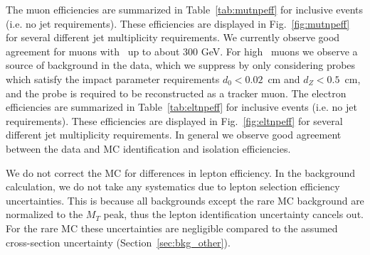 The muon efficiencies are summarized in Table~\ref{tab:mutnpeff} for inclusive events (i.e. no jet requirements). These efficiencies are displayed in Fig.~\ref{fig:mutnpeff} for
several different jet multiplicity requirements. 
We currently observe good agreement for muons with \pt\ up to about 300 GeV. 
For high \pt\ muons we observe a source of background in the data, which we suppress by only considering probes which satisfy the impact parameter requirements $d_0<0.02$~cm and $d_Z<0.5$~cm, and the probe is required to be reconstructed as a tracker muon.
The electron efficiencies are summarized in Table~\ref{tab:eltnpeff} for inclusive events (i.e. no jet requirements). These efficiencies are displayed in Fig.~\ref{fig:eltnpeff} 
for several different jet multiplicity requirements. In general we observe good agreement between the data and MC identification and isolation efficiencies.

We
do not correct the MC for differences in lepton efficiency.  In the
background calculation, we do not take any systematics due to lepton
selection
efficiency uncertainties.  This is because all backgrounds except the 
rare MC background are normalized to the $M_T$ peak, thus the lepton
identification uncertainty cancels out.  For the rare MC these
uncertainties
are negligible compared to the assumed cross-section uncertainty
(Section~\ref{sec:bkg_other}).




